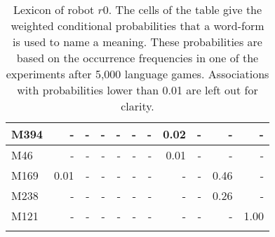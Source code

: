 \begin{table}[t]
{\begin{tabular}{ld{3}d{3}d{3}d{3}d{3}d{3}d{3}d{3}d{3}d{3}}
M394 & - & - & - & - & - & - & 0.02 & - & - & -\\\hline
M46 & - & - & - & - & - & - & 0.01 & - & - & -\\\hline
M169 & 0.01 & - & - & - & - & - & - & - & 0.46 & -\\\hline
M238 & - & - & - & - & - & - & - & - & 0.26 & -\\\hline
M121 & - & - & - & - & - & - & - & - & - & 1.00\\
\lspbottomrule
\end{tabular}}
\caption{Lexicon of robot $r0$. The cells of the table give the weighted conditional probabilities that a word-form is used to name a meaning. These probabilities are based on the occurrence frequencies in one of the experiments after 5,000 language games. Associations with probabilities lower than 0.01 are left out for clarity.}
\label{t:st:lexicon0}
\end{table}

